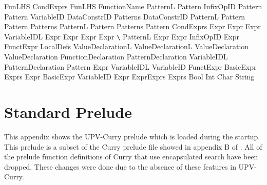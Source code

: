 \documentclass[titlepage,fleqn]{article}
\begin{document}
{\begin{tabbing}
         \Or FunLHS CondExprs  \sig
FunLHS \as FunctionName PatternL
       \Or Pattern InfixOpID Pattern \sig
Pattern \as VariableID \Or \x{\_}
        \Or DataConstrID
        \Or \x{()} \Or \x{(}Patterns\x{)} 
        \Or \x{(} DataConstrID PatternL \x{)}
        \Or \x{(} Pattern \x{:} Pattern \x{)}
        \Or \x{[]} \Or \x{[}Patterns\x{]}
        \sig
PatternL \as Pattern  \sig
Patterns \as Pattern  \sig
CondExprs \as \x{|} Expr \x{=} Expr  \sig
Expr \as {} VariableIDL   Expr
     \Or {} Expr  Expr  Expr
     \Or \verb+\+ PatternL \x{->} Expr
     \Or Expr InfixOpID Expr
     \Or FunctExpr
     \sig
LocalDefs \as \x{\{} ValueDeclarationL \x{\}} \sig
ValueDeclarationL \as  ValueDeclaration  \sig
ValueDeclaration \as FunctionDeclaration \Or PatternDeclaration
     \Or VariableIDL  \sig
PatternDeclaration \as Pattern \x{=} Expr  \sig
VariableIDL \as VariableID  \sig
FunctExpr \as {} BasicExpr \sig
Exprs \as Expr  \sig
BasicExpr \as VariableID 
          \Or \x{()} 
          \Or \x{(}Expr\x{)}
          \Or \x{(}Expr\x{,}Exprs\x{)} 
          \Or \x{[]} \Or \x{[}Exprs\x{]} 
          \Or Bool \oR Int \oR 
              Char \oR String \sig
\end{tabbing}
}

\section{ Standard Prelude}\label{prelude}

This appendix shows the UPV-Curry prelude which is loaded during the startup.
This prelude is a subset of the Curry prelude file showed in
appendix B of \cite{Hanus98Curry}.
All of the prelude function definitions of Curry
that use encapsulated search have been dropped.
These changes were done due to the absence of these features in 
UPV-Curry.
\end{document}
